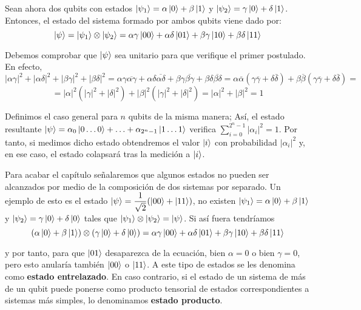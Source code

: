 Sean ahora dos qubits con estados $\left|\psi_1\right\rangle=\alpha\left|0\right\rangle+\beta\left|1\right\rangle$ y $\left|\psi_2\right\rangle=\gamma\left|0\right\rangle+\delta\left|1\right\rangle$. Entonces, el estado del sistema formado por ambos qubits viene dado por:
\[\left|\psi\right\rangle=\left|\psi_1\right\rangle\otimes\left|\psi_2\right\rangle=\alpha\gamma\left|00\right\rangle+\alpha\delta\left|01\right\rangle+\beta\gamma\left|10\right\rangle+\beta\delta\left|11\right\rangle\]

Debemos comprobar que $\left|\psi\right\rangle$ sea unitario para que verifique el primer postulado. En efecto,
\[|\alpha\gamma|^2+|\alpha\delta|^2+|\beta\gamma|^2+|\beta\delta|^2=\alpha\gamma\overline{\alpha\gamma}+\alpha\delta\overline{\alpha\delta}+\beta\gamma\overline{\beta\gamma}+\beta\delta\overline{\beta\delta}=\alpha\overline{\alpha}(\gamma\overline{\gamma}+\delta\overline{\delta})+\beta\overline{\beta}(\gamma\overline{\gamma}+\delta\overline{\delta})=\]
\[=|\alpha|^2(|\gamma|^2+|\delta|^2)+|\beta|^2(|\gamma|^2+|\delta|^2)=|\alpha|^2+|\beta|^2=1\]

Definimos el caso general para $n$ qubits de la misma manera; Así, el estado resultante $\left|\psi\right\rangle=\alpha_0\left|0\hdots0\right\rangle+\hdots+\alpha_{2^n-1}\left|1\hdots1\right\rangle$ verifica $\sum_{i=0}^{2^n-1}|\alpha_i|^2=1$. Por tanto, si medimos dicho estado obtendremos el valor $\left|i\right\rangle$ con probabilidad $|\alpha_i|^2$ y, en ese caso, el estado colapsará tras la medición a $\left|i\right\rangle$.

Para acabar el capítulo señalaremos que algunos estados no pueden ser alcanzados por medio de la composición de dos sistemas por separado. Un ejemplo de esto es el estado $\left|\psi\right\rangle=\dfrac{1}{\sqrt{2}}(\left|00\right\rangle+\left|11\right\rangle)$, no existen $\left|\psi_1\right\rangle=\alpha\left|0\right\rangle+\beta\left|1\right\rangle$ y $\left|\psi_2\right\rangle=\gamma\left|0\right\rangle+\delta\left|0\right\rangle$ tales que $\left|\psi_1\right\rangle\otimes\left|\psi_2\right\rangle=\left|\psi\right\rangle$. Si así fuera tendríamos
\[(\alpha\left|0\right\rangle+\beta\left|1\right\rangle)\otimes(\gamma\left|0\right\rangle+\delta\left|0\right\rangle)=\alpha\gamma\left|00\right\rangle+\alpha\delta\left|01\right\rangle+\beta\gamma\left|10\right\rangle+\beta\delta\left|11\right\rangle\]

y por tanto, para que $\left|01\right\rangle$ desaparezca de la ecuación, bien $\alpha =0$ o bien $\gamma=0$, pero esto anularía también $\left|00\right\rangle$ o $\left|11\right\rangle$. A este tipo de estados se les denomina como \textbf{estado entrelazado}. En caso contrario, si el estado de un sistema de más de un qubit puede ponerse como producto tensorial de estados correspondientes a sistemas más simples, lo denominamos \textbf{estado producto}.

